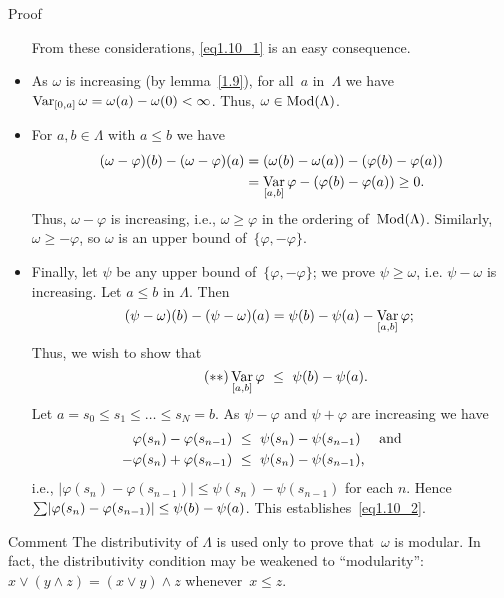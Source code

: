 \documentclass[main.tex]{subfiles}
\begin{document}
\begin{psec*}{Proof}
\begin{itemize}
From these considerations, \eqref{eq1.10_1} is an easy consequence.
%
\item
As $\omega$ is increasing (by lemma~\ref{1.9}),
for all~$a$ in~$\Lambda$ 
we have $\mathop{\mathrm{Var}}_{[0,a]}\omega = \omega(a)-\omega(0)<\infty$.
Thus, $\omega\in\mathrm{Mod}(\Lambda)$.
%
\item
For $a,b\in\Lambda$ with $a\leq b$ we have
\begin{align*}
(\omega - \varphi)(b) - (\omega-\varphi)(a)
  & = (\omega(b) - \omega(a)) - (\varphi(b) - \varphi(a)) \\
  & = \mathop{\mathrm{Var}}_{[a,b]}\varphi - (\varphi(b) - \varphi(a)) \ge 0
\text{.}
\end{align*}
Thus, $\omega-\varphi$ is increasing, 
i.e., $\omega\ge \varphi$ in the ordering of~$\mathrm{Mod}(\Lambda)$.
Similarly, $\omega\geq -\varphi$,
so $\omega$ is an upper bound of~$\{ \varphi, -\varphi \}$.
%
\item
Finally, 
let $\psi$ be any upper bound of~$\{\varphi,-\varphi\}$;
we prove $\psi\ge \omega$,
i.e. $\psi-\omega$ is increasing.
Let $a\leq b$ in $\Lambda$.
Then 
\begin{equation*}
(\psi-\omega)(b) - (\psi-\omega)(a)
  = \psi(b) - \psi(a) - \mathop{\mathrm{Var}}_{[a,b]}\varphi
\text{; }
\end{equation*}
Thus, 
we wish to show that
\begin{equation}
\label{eq1.10_2}  \tag{$**$}
\mathop{\mathrm{Var}}_{[a,b]}\varphi \ \leq\  \psi(b)-\psi(a) \text{.}
\end{equation}
Let $a=s_0\leq s_1 \leq \ldots \leq s_N = b$.
As $\psi-\varphi$ and $\psi+\varphi$ are increasing we have
\begin{align*}
\varphi(s_n) - \varphi(s_{n-1})
  &\  \leq\  \psi(s_n) - \psi(s_{n-1}) 
\quad\text{ and }\quad \\
-\varphi(s_n) + \varphi(s_{n-1})
  &\  \leq\  \psi(s_n) - \psi(s_{n-1})
\text{,}
\end{align*}
i.e., 
$|\varphi(s_n) - \varphi(s_{n-1})| 
  \leq \psi(s_n) - \psi(s_{n-1})$ 
for each $n$.
Hence~$\smash{\sum} |\varphi(s_n) - \varphi(s_{n-1})|
  \leq \psi (b) - \psi(a)$.
This establishes~\eqref{eq1.10_2}. \xqed
\end{itemize}
\end{psec*}
\begin{psec*}{Comment}
The distributivity of $\Lambda$ is used only to prove
that~$\omega$ is modular.  
In fact, 
the distributivity condition 
may be weakened to ``modularity'':
$x\vee(y\wedge z) = (x\vee y)\wedge z$
whenever~$x\leq z$.
\end{psec*}
\end{document}
